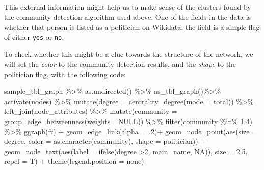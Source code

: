 \documentclass[
]{book}
\newenvironment{Shaded}{\begin{snugshade}}{\end{snugshade}}
\newcommand{\AttributeTok}[1]{\textcolor[rgb]{0.77,0.63,0.00}{#1}}
\newcommand{\ConstantTok}[1]{\textcolor[rgb]{0.00,0.00,0.00}{#1}}
\newcommand{\DecValTok}[1]{\textcolor[rgb]{0.00,0.00,0.81}{#1}}
\newcommand{\FloatTok}[1]{\textcolor[rgb]{0.00,0.00,0.81}{#1}}
\newcommand{\FunctionTok}[1]{\textcolor[rgb]{0.00,0.00,0.00}{#1}}
\newcommand{\NormalTok}[1]{#1}
\newcommand{\SpecialCharTok}[1]{\textcolor[rgb]{0.00,0.00,0.00}{#1}}
\newcommand{\StringTok}[1]{\textcolor[rgb]{0.31,0.60,0.02}{#1}}
\begin{document}
This external information might help us to make sense of the clusters found by the community detection algorithm used above. One of the fields in the data is whether that person is listed as a politician on Wikidata: the field is a simple flag of either \texttt{yes} or \texttt{no}.

To check whether this might be a clue towards the structure of the network, we will set the \emph{color} to the community detection results, and the \emph{shape} to the politician flag, with the following code:

\begin{Shaded}
\begin{Highlighting}[]
\NormalTok{sample\_tbl\_graph }\SpecialCharTok{\%\textgreater{}\%} 
  \FunctionTok{as.undirected}\NormalTok{() }\SpecialCharTok{\%\textgreater{}\%} 
  \FunctionTok{as\_tbl\_graph}\NormalTok{()}\SpecialCharTok{\%\textgreater{}\%} 
  \FunctionTok{activate}\NormalTok{(nodes) }\SpecialCharTok{\%\textgreater{}\%} 
  \FunctionTok{mutate}\NormalTok{(}\AttributeTok{degree =} \FunctionTok{centrality\_degree}\NormalTok{(}\AttributeTok{mode =} \StringTok{\textquotesingle{}total\textquotesingle{}}\NormalTok{)) }\SpecialCharTok{\%\textgreater{}\%} 
  \FunctionTok{left\_join}\NormalTok{(node\_attributes) }\SpecialCharTok{\%\textgreater{}\%} 
  \FunctionTok{mutate}\NormalTok{(}\AttributeTok{community =} \FunctionTok{group\_edge\_betweenness}\NormalTok{(}\AttributeTok{weights =}\ConstantTok{NULL}\NormalTok{)) }\SpecialCharTok{\%\textgreater{}\%} 
  \FunctionTok{filter}\NormalTok{(community }\SpecialCharTok{\%in\%} \DecValTok{1}\SpecialCharTok{:}\DecValTok{4}\NormalTok{) }\SpecialCharTok{\%\textgreater{}\%} 
  \FunctionTok{ggraph}\NormalTok{(}\StringTok{\textquotesingle{}fr\textquotesingle{}}\NormalTok{) }\SpecialCharTok{+} 
  \FunctionTok{geom\_edge\_link}\NormalTok{(}\AttributeTok{alpha =}\NormalTok{ .}\DecValTok{2}\NormalTok{)}\SpecialCharTok{+} 
  \FunctionTok{geom\_node\_point}\NormalTok{(}\FunctionTok{aes}\NormalTok{(}\AttributeTok{size =}\NormalTok{ degree, }\AttributeTok{color =} \FunctionTok{as.character}\NormalTok{(community), }\AttributeTok{shape =}\NormalTok{ politician))  }\SpecialCharTok{+} 
  \FunctionTok{geom\_node\_text}\NormalTok{(}\FunctionTok{aes}\NormalTok{(}\AttributeTok{label =} \FunctionTok{ifelse}\NormalTok{(degree }\SpecialCharTok{\textgreater{}}\DecValTok{2}\NormalTok{, main\_name, }\ConstantTok{NA}\NormalTok{)), }\AttributeTok{size =} \FloatTok{2.5}\NormalTok{, }\AttributeTok{repel =}\NormalTok{ T) }\SpecialCharTok{+} 
  \FunctionTok{theme}\NormalTok{(}\AttributeTok{legend.position =} \StringTok{\textquotesingle{}none\textquotesingle{}}\NormalTok{)}
\end{Highlighting}
\end{Shaded}
\end{document}
